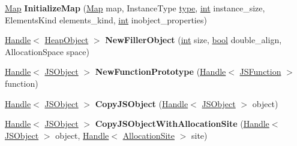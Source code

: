 \begin{DoxyCompactItemize}
\mbox{\hyperlink{classv8_1_1internal_1_1Map}{Map}} {\bfseries Initialize\+Map} (\mbox{\hyperlink{classv8_1_1internal_1_1Map}{Map}} map, Instance\+Type \mbox{\hyperlink{classstd_1_1conditional_1_1type}{type}}, \mbox{\hyperlink{classint}{int}} instance\+\_\+size, Elements\+Kind elements\+\_\+kind, \mbox{\hyperlink{classint}{int}} inobject\+\_\+properties)
\item 
\mbox{\label{classv8_1_1internal_1_1Factory_a0061aebd55bf01be9a850aaf45ddf4d5}} 
\mbox{\hyperlink{classv8_1_1internal_1_1Handle}{Handle}}$<$ \mbox{\hyperlink{classv8_1_1internal_1_1HeapObject}{Heap\+Object}} $>$ {\bfseries New\+Filler\+Object} (\mbox{\hyperlink{classint}{int}} size, \mbox{\hyperlink{classbool}{bool}} double\+\_\+align, Allocation\+Space space)
\item 
\mbox{\label{classv8_1_1internal_1_1Factory_a48782380c9d9ae51f8b50520b5717240}} 
\mbox{\hyperlink{classv8_1_1internal_1_1Handle}{Handle}}$<$ \mbox{\hyperlink{classv8_1_1internal_1_1JSObject}{J\+S\+Object}} $>$ {\bfseries New\+Function\+Prototype} (\mbox{\hyperlink{classv8_1_1internal_1_1Handle}{Handle}}$<$ \mbox{\hyperlink{classv8_1_1internal_1_1JSFunction}{J\+S\+Function}} $>$ function)
\item 
\mbox{\label{classv8_1_1internal_1_1Factory_a3c0049b99b784210fe7f691da47e9af0}} 
\mbox{\hyperlink{classv8_1_1internal_1_1Handle}{Handle}}$<$ \mbox{\hyperlink{classv8_1_1internal_1_1JSObject}{J\+S\+Object}} $>$ {\bfseries Copy\+J\+S\+Object} (\mbox{\hyperlink{classv8_1_1internal_1_1Handle}{Handle}}$<$ \mbox{\hyperlink{classv8_1_1internal_1_1JSObject}{J\+S\+Object}} $>$ object)
\item 
\mbox{\label{classv8_1_1internal_1_1Factory_a411ce25e26a30e3e3641bb0f6e48b6b4}} 
\mbox{\hyperlink{classv8_1_1internal_1_1Handle}{Handle}}$<$ \mbox{\hyperlink{classv8_1_1internal_1_1JSObject}{J\+S\+Object}} $>$ {\bfseries Copy\+J\+S\+Object\+With\+Allocation\+Site} (\mbox{\hyperlink{classv8_1_1internal_1_1Handle}{Handle}}$<$ \mbox{\hyperlink{classv8_1_1internal_1_1JSObject}{J\+S\+Object}} $>$ object, \mbox{\hyperlink{classv8_1_1internal_1_1Handle}{Handle}}$<$ \mbox{\hyperlink{classv8_1_1internal_1_1AllocationSite}{Allocation\+Site}} $>$ site)
\item 
\mbox{\label{classv8_1_1internal_1_1Factory_ad5d1dcf17fdd7dbaa391b60f184545e1}} 

\end{DoxyCompactItemize}
